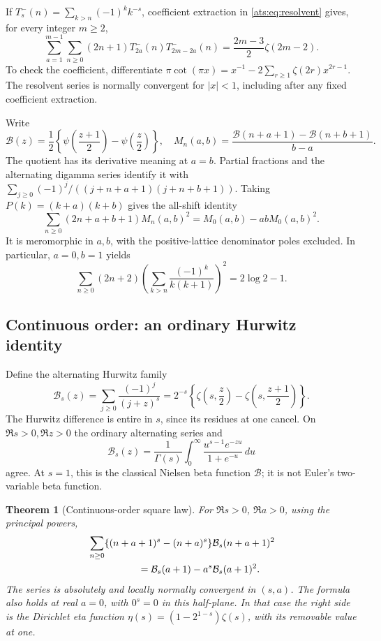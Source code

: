 \documentclass[11pt,a4paper]{article}
\numberwithin{equation}{section}
\newtheorem{theorem}{Theorem}[section]
\theoremstyle{definition}
\theoremstyle{remark}
\begin{document}
If $T_s^-(n)=\sum_{k>n}(-1)^k k^{-s}$, coefficient extraction in
\eqref{ats:eq:resolvent} gives, for every integer $m\ge2$,
\begin{equation}\label{ats:eq:convolution}
 \sum_{a=1}^{m-1}\sum_{n\ge0}(2n+1)
            T_{2a}^-(n)T_{2m-2a}^-(n)
 =\frac{2m-3}{2}\zeta(2m-2).
\end{equation}
To check the coefficient, differentiate
$\pi\cot(\pi x)=x^{-1}-2\sum_{r\ge1}\zeta(2r)x^{2r-1}$.
The resolvent series is normally convergent for $|x|<1$, including
after any fixed coefficient extraction.

Write
\[
 \mathcal B(z)=\frac12\left\{\psi\left(\frac{z+1}{2}\right)
                              -\psi\left(\frac z2\right)\right\},
 \quad
 M_n(a,b)=\frac{\mathcal B(n+a+1)-\mathcal B(n+b+1)}{b-a}.
\]
The quotient has its derivative meaning at $a=b$.
Partial fractions and the alternating digamma series identify it with
$\sum_{j\ge0}(-1)^j/((j+n+a+1)(j+n+b+1))$.
Taking $P(k)=(k+a)(k+b)$ gives the all-shift identity
\begin{equation}\label{ats:eq:two-shift}
 \sum_{n\ge0}(2n+a+b+1)M_n(a,b)^2
 =M_0(a,b)-abM_0(a,b)^2.
\end{equation}
It is meromorphic in $a,b$, with the positive-lattice denominator
poles excluded. In particular, $a=0,b=1$ yields
\[
 \sum_{n\ge0}(2n+2)
  \left(\sum_{k>n}\frac{(-1)^k}{k(k+1)}\right)^2
 =2\log2-1.
\]

\subsection{Continuous order: an ordinary Hurwitz identity}

Define the alternating Hurwitz family
\begin{equation}\label{ats:eq:beta-s}
 \mathcal B_s(z)=\sum_{j\ge0}\frac{(-1)^j}{(j+z)^s}
 =2^{-s}\left\{\zeta\left(s,\frac z2\right)
              -\zeta\left(s,\frac{z+1}{2}\right)\right\}.
\end{equation}
The Hurwitz difference is entire in $s$, since its residues at one
cancel. On $\Re s>0,\Re z>0$ the ordinary alternating series and
\[
 \mathcal B_s(z)=\frac1{\Gamma(s)}
       \int_0^{\infty}\frac{u^{s-1}e^{-zu}}{1+e^{-u}}\,du
\]
agree. At $s=1$, this is the classical Nielsen beta function \cite{NielsenBeta}
$\mathcal B$; it is not Euler's two-variable beta function.

\begin{theorem}[Continuous-order square law]
\label{ats:thm:continuous}
For $\Re s>0$, $\Re a>0$, using the principal powers,
\begin{align}\label{ats:eq:continuous}
 &\sum_{n\ge0}\{(n+a+1)^s-(n+a)^s\}
                      \mathcal B_s(n+a+1)^2\notag\\
 &\hspace{18mm}=\mathcal B_s(a+1)-a^s\mathcal B_s(a+1)^2.
\end{align}
The series is absolutely and locally normally convergent in $(s,a)$.
The formula also holds at real $a=0$, with $0^s=0$ in this half-plane.
In that case the right side is the Dirichlet eta function
$\eta(s)=(1-2^{1-s})\zeta(s)$, with its removable value at one.
\end{theorem}
\end{document}
